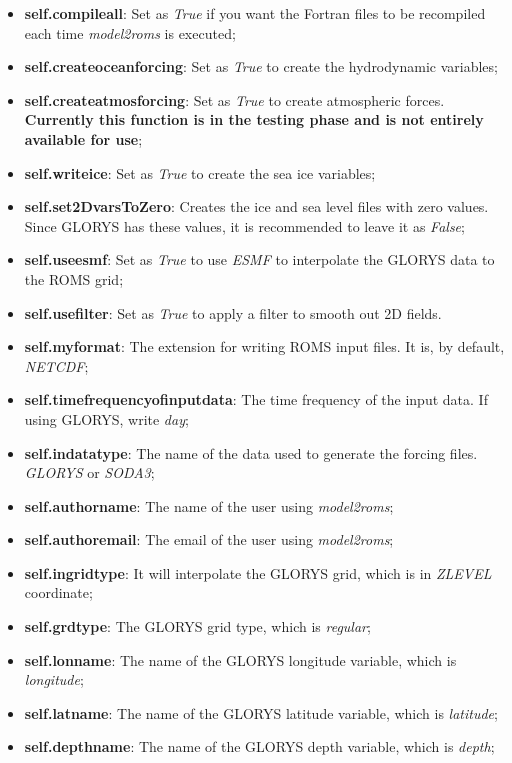 \begin{itemize}
    \item \textbf{self.compileall}: Set as \textit{True} if you want the Fortran files to be recompiled each time \textit{model2roms} is executed;
    \item \textbf{self.createoceanforcing}: Set as \textit{True} to create the hydrodynamic variables;
    \item \textbf{self.createatmosforcing}: Set as \textit{True} to create atmospheric forces. \textbf{Currently this function is in the testing phase and is not entirely available for use};
    \item \textbf{self.writeice}: Set as \textit{True} to create the sea ice variables;
    \item \textbf{self.set2DvarsToZero}: Creates the ice and sea level files with zero values. Since GLORYS has these values, it is recommended to leave it as \textit{False};
    \item \textbf{self.useesmf}: Set as \textit{True} to use \textit{ESMF} to interpolate the GLORYS data to the ROMS grid;
    \item \textbf{self.usefilter}: Set as \textit{True} to apply a filter to smooth out 2D fields.
    \item \textbf{self.myformat}: The extension for writing ROMS input files. It is, by default, \textit{NETCDF};
    \item \textbf{self.timefrequencyofinputdata}: The time frequency of the input data. If using GLORYS, write \textit{day};
    \item \textbf{self.indatatype}: The name of the data used to generate the forcing files. \textit{GLORYS} or \textit{SODA3};
    \item \textbf{self.authorname}: The name of the user using \textit{model2roms};
    \item \textbf{self.authoremail}: The email of the user using \textit{model2roms};
    \item \textbf{self.ingridtype}: It will interpolate the GLORYS grid, which is in \textit{ZLEVEL} coordinate;
    \item \textbf{self.grdtype}: The GLORYS grid type, which is \textit{regular};
    \item \textbf{self.lonname}: The name of the GLORYS longitude variable, which is \textit{longitude};
    \item \textbf{self.latname}: The name of the GLORYS latitude variable, which is \textit{latitude};
    \item \textbf{self.depthname}: The name of the GLORYS depth variable, which is \textit{depth};

\end{itemize}
